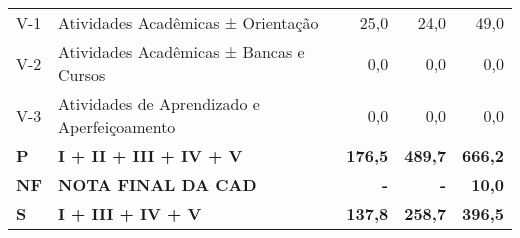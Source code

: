 \documentclass[11pt,a4paper]{article}
\begin{document}
\begin{table}[ht]
{\begin{tabular}{|l|l|r|r|r|}
  V-1 & Atividades Acadêmicas ± Orientação & 25,0 & 24,0 & 49,0 \\ 
  V-2 & Atividades Acadêmicas ± Bancas e Cursos & 0,0 & 0,0 & 0,0 \\ 
  V-3 & Atividades de Aprendizado e Aperfeiçoamento & 0,0 & 0,0 & 0,0 \\ 
  \textbf{P} & \textbf{I + II + III + IV + V} & \textbf{176,5} & \textbf{489,7} & \textbf{666,2} \\ 
  \textbf{NF} & \textbf{NOTA FINAL DA CAD} & \textbf{-} & \textbf{-} & \textbf{10,0} \\ 
  \textbf{S} & \textbf{I + III + IV + V} & \textbf{137,8} & \textbf{258,7} & \textbf{396,5} \\ 
   \hline
\end{tabular}
}
\end{table}
\end{document}
